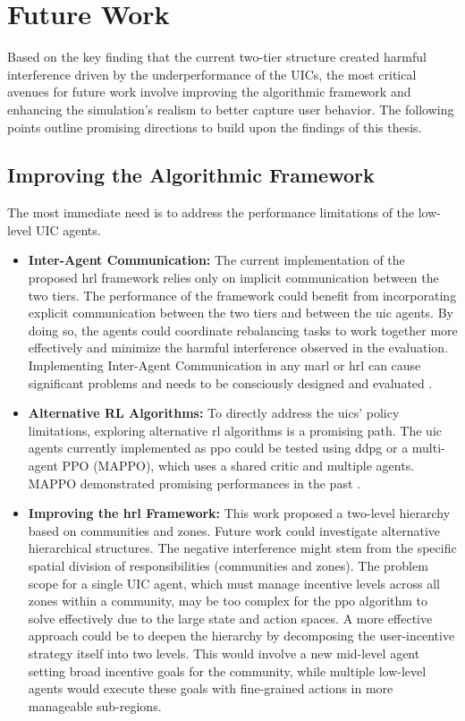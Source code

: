 \section{Future Work}\label{sec:conclusion-future_work}
Based on the key finding that the current two-tier structure created harmful interference driven by the underperformance of the UICs, the most critical avenues for future work involve improving the algorithmic framework and enhancing the simulation's realism to better capture user behavior.
The following points outline promising directions to build upon the findings of this thesis.

\subsection{Improving the Algorithmic Framework}
The most immediate need is to address the performance limitations of the low-level UIC agents.

\begin{itemize}
    \item \textbf{Inter-Agent Communication:}
        The current implementation of the proposed \gls{hrl} framework relies only on implicit communication between the two tiers.
        The performance of the framework could benefit from incorporating explicit communication between the two tiers and between the \gls{uic} agents.
        By doing so, the agents could coordinate rebalancing tasks to work together more effectively and minimize the harmful interference observed in the evaluation.
        Implementing Inter-Agent Communication in any \gls{marl} or \gls{hrl} can cause significant problems and needs to be consciously designed and evaluated \cite{pateria_hierarchical_2021}.
    \item \textbf{Alternative RL Algorithms:}
        To directly address the \glspl{uic}' policy limitations, exploring alternative \gls{rl} algorithms is a promising path. 
        The \gls{uic} agents currently implemented as \gls{ppo} could be tested using \gls{ddpg} or a multi-agent PPO (MAPPO), which uses a shared critic and multiple agents.
        MAPPO demonstrated promising performances in the past \cite{yu_surprising_2022}.
    \item \textbf{Improving the \gls{hrl} Framework:}
        This work proposed a two-level hierarchy based on communities and zones.
        Future work could investigate alternative hierarchical structures.
        The negative interference might stem from the specific spatial division of responsibilities (communities and zones).
        The problem scope for a single UIC agent, which must manage incentive levels across all zones within a community, may be too complex for the \gls{ppo} algorithm to solve effectively due to the large state and action spaces.
        A more effective approach could be to deepen the hierarchy by decomposing the user-incentive strategy itself into two levels.
        This would involve a new mid-level agent setting broad incentive goals for the community, while multiple low-level agents would execute these goals with fine-grained actions in more manageable sub-regions.
\end{itemize}

